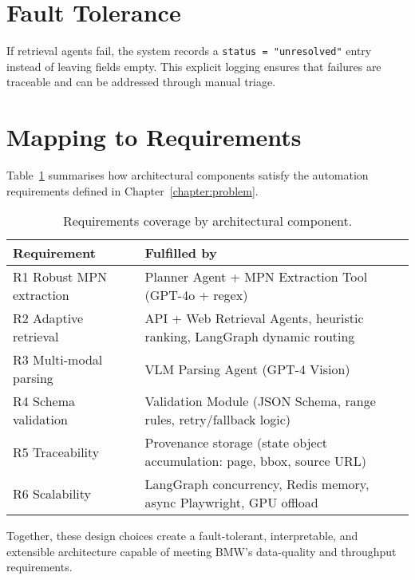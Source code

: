 \section{Fault Tolerance}
If retrieval agents fail, the system records a \verb|status = "unresolved"| entry instead of leaving fields empty. This explicit logging ensures that failures are traceable and can be addressed through manual triage.

\section{Mapping to Requirements}
Table~\ref{tab:reqmap} summarises how architectural components satisfy the automation requirements defined in Chapter~\ref{chapter:problem}.

\begin{table}[ht]
  \centering
  \caption{Requirements coverage by architectural component.}
  \label{tab:reqmap}
  \begin{tabular}{ll}
    \hline
    Requirement & Fulfilled by \\\hline
    R1 Robust MPN extraction & Planner Agent + MPN Extraction Tool (GPT-4o + regex) \\
    R2 Adaptive retrieval    & API + Web Retrieval Agents, heuristic ranking, LangGraph dynamic routing \\
    R3 Multi-modal parsing   & VLM Parsing Agent (GPT-4 Vision) \\
    R4 Schema validation     & Validation Module (JSON Schema, range rules, retry/fallback logic) \\
    R5 Traceability          & Provenance storage (state object accumulation: page, bbox, source URL) \\
    R6 Scalability           & LangGraph concurrency, Redis memory, async Playwright, GPU offload \\\hline
  \end{tabular}
\end{table}

Together, these design choices create a fault-tolerant, interpretable, and extensible architecture capable of meeting BMW's data-quality and throughput requirements.
